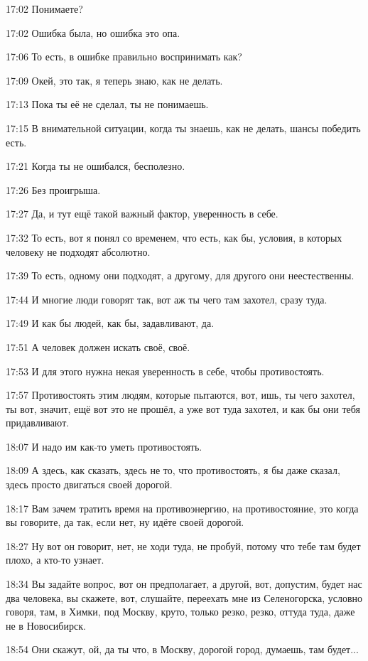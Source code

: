 17:02
Понимаете?

17:02
Ошибка была, но ошибка это опа.

17:06
То есть, в ошибке правильно воспринимать как?

17:09
Окей, это так, я теперь знаю, как не делать.

17:13
Пока ты её не сделал, ты не понимаешь.

17:15
В внимательной ситуации, когда ты знаешь, как не делать, шансы победить есть.

17:21
Когда ты не ошибался, бесполезно.

17:26
Без проигрыша.

17:27
Да, и тут ещё такой важный фактор, уверенность в себе.

17:32
То есть, вот я понял со временем, что есть, как бы, условия, в которых человеку не подходят абсолютно.

17:39
То есть, одному они подходят, а другому, для другого они неестественны.

17:44
И многие люди говорят так, вот аж ты чего там захотел, сразу туда.

17:49
И как бы людей, как бы, задавливают, да.

17:51
А человек должен искать своё, своё.

17:53
И для этого нужна некая уверенность в себе, чтобы противостоять.

17:57
Противостоять этим людям, которые пытаются, вот, ишь, ты чего захотел, ты вот, значит, ещё вот это не прошёл, а уже вот туда захотел, и как бы они тебя придавливают.

18:07
И надо им как-то уметь противостоять.

18:09
А здесь, как сказать, здесь не то, что противостоять, я бы даже сказал, здесь просто двигаться своей дорогой.

18:17
Вам зачем тратить время на противоэнергию, на противостояние, это когда вы говорите, да так, если нет, ну идёте своей дорогой.

18:27
Ну вот он говорит, нет, не ходи туда, не пробуй, потому что тебе там будет плохо, а кто-то узнает.

18:34
Вы задайте вопрос, вот он предполагает, а другой, вот, допустим, будет нас два человека, вы скажете, вот, слушайте, переехать мне из Селеногорска, условно говоря, там, в Химки, под Москву, круто, только резко, резко, оттуда туда, даже не в Новосибирск.

18:54
Они скажут, ой, да ты что, в Москву, дорогой город, думаешь, там будет...

